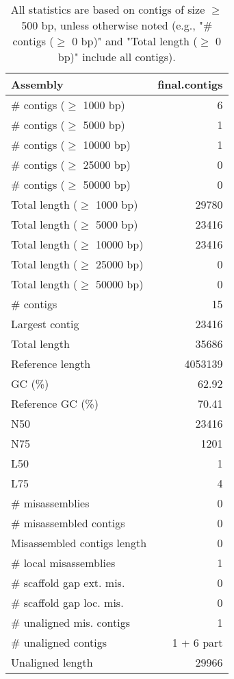 \documentclass[12pt,a4paper]{article}
\begin{document}
\begin{table}[ht]
\begin{center}
\caption{All statistics are based on contigs of size $\geq$ 500 bp, unless otherwise noted (e.g., "\# contigs ($\geq$ 0 bp)" and "Total length ($\geq$ 0 bp)" include all contigs).}
\begin{tabular}{|l*{1}{|r}|}
\hline
Assembly & final.contigs \\ \hline
\# contigs ($\geq$ 1000 bp) & 6 \\ \hline
\# contigs ($\geq$ 5000 bp) & 1 \\ \hline
\# contigs ($\geq$ 10000 bp) & 1 \\ \hline
\# contigs ($\geq$ 25000 bp) & 0 \\ \hline
\# contigs ($\geq$ 50000 bp) & 0 \\ \hline
Total length ($\geq$ 1000 bp) & 29780 \\ \hline
Total length ($\geq$ 5000 bp) & 23416 \\ \hline
Total length ($\geq$ 10000 bp) & 23416 \\ \hline
Total length ($\geq$ 25000 bp) & 0 \\ \hline
Total length ($\geq$ 50000 bp) & 0 \\ \hline
\# contigs & 15 \\ \hline
Largest contig & 23416 \\ \hline
Total length & 35686 \\ \hline
Reference length & 4053139 \\ \hline
GC (\%) & 62.92 \\ \hline
Reference GC (\%) & 70.41 \\ \hline
N50 & 23416 \\ \hline
N75 & 1201 \\ \hline
L50 & 1 \\ \hline
L75 & 4 \\ \hline
\# misassemblies & 0 \\ \hline
\# misassembled contigs & 0 \\ \hline
Misassembled contigs length & 0 \\ \hline
\# local misassemblies & 1 \\ \hline
\# scaffold gap ext. mis. & 0 \\ \hline
\# scaffold gap loc. mis. & 0 \\ \hline
\# unaligned mis. contigs & 1 \\ \hline
\# unaligned contigs & 1 + 6 part \\ \hline
Unaligned length & 29966 \\ \hline

\end{tabular}
\end{center}
\end{table}
\end{document}
